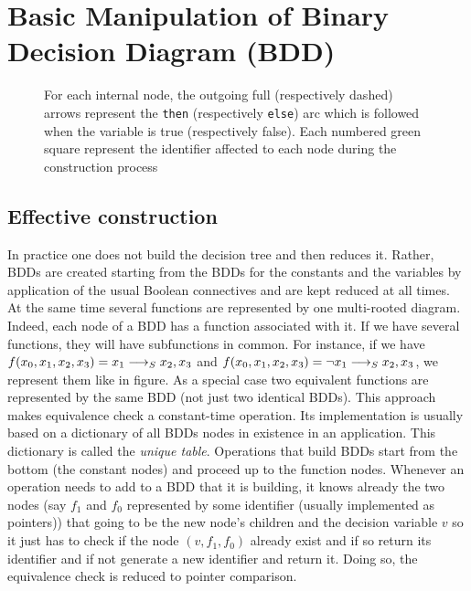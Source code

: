 \documentclass[a4paper,10pt]{article}
\newcommand{\includeframe}[4]{\makebox[#2\linewidth]{\texttt{[image: \#4]}}}
\begin{document}

\section{Basic Manipulation of Binary Decision Diagram (BDD)}


\begin{figure}
\centering
\includeframe{1}{1}{}{draws.pdf}
\caption{For each internal node, the outgoing full (respectively dashed) arrows represent the \texttt{then} (respectively \texttt{else}) arc which is followed when the variable is true (respectively false). Each numbered green square represent the identifier affected to each node during the construction process}
\label{draws1}
\end{figure}


\subsection{Effective construction}
In practice one does not build the decision tree and then reduces it.
Rather, BDDs are created starting from the BDDs for the constants and the variables by application of the usual Boolean connectives and are kept reduced at all times.
At the same time several functions are represented by one multi-rooted diagram.
Indeed, each node of a BDD has a function associated with it.
If we have several functions, they will have subfunctions in common.
For instance, if we have $f(x_0, x_1, x_2, x_3) = x_1 \longrightarrow_S x_2, x_3$ and $f(x_0, x_1, x_2, x_3) = \lnot x_1 \longrightarrow_S x_2, x_3$, we represent them like in figure. As a special case two equivalent functions are represented by the same BDD (not just two identical BDDs).
This approach makes equivalence check a constant-time operation.
Its implementation is usually based on a dictionary of all BDDs nodes in existence in an application.
This dictionary is called the \textit{unique table}.
Operations that build BDDs start from the bottom (the constant nodes) and proceed up to the function nodes.
Whenever an operation needs to add to a BDD that it is building, it knows already the two nodes (say $f_1$ and $f_0$ represented by some identifier (usually implemented as pointers)) that going to be the new node's children and the decision variable $v$ so it just has to check if the node $(v, f_1, f_0)$ already exist and if so return its identifier and if not generate a new identifier and return it.
Doing so, the equivalence check is reduced to pointer comparison.
\end{document}
